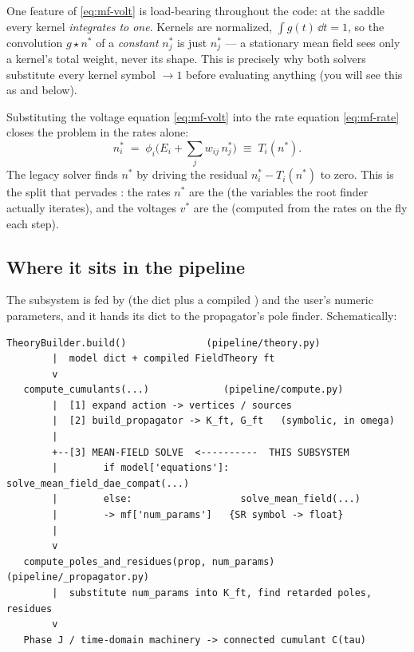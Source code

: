One feature of \eqref{eq:mf-volt} is load-bearing throughout the code: at the
saddle every kernel \emph{integrates to one}. Kernels are normalized,
$\int g(t)\,\dd t = 1$, so the convolution $g\star n^{*}$ of a \emph{constant}
$n^{*}_j$ is just $n^{*}_j$ --- a stationary mean field sees only a kernel's total
weight, never its shape. This is precisely why both solvers substitute every
kernel symbol $\to 1$ before evaluating anything (you will see this as
 and  below).

Substituting the voltage equation \eqref{eq:mf-volt} into the rate equation
\eqref{eq:mf-rate} closes the problem in the rates alone:
\begin{equation}
  n^{*}_i \;=\; \phi_i\!\Big(E_i + \sum_j w_{ij}\, n^{*}_j\Big)
    \;\equiv\; T_i(n^{*}).
  \label{eq:mf-closure}
\end{equation}
The legacy solver finds $n^{*}$ by driving the residual $n^{*}_i - T_i(n^{*})$ to
zero. This is the split that pervades : the rates $n^{*}$
are the  (the variables the root finder actually
iterates), and the voltages $v^{*}$ are the  (computed from
the rates on the fly each step).

\subsection{Where it sits in the pipeline}

The subsystem is fed by  (the  dict plus a
compiled ) and the user's numeric parameters, and it hands its
 dict to the propagator's pole finder. Schematically:

\begin{lstlisting}[style=console]
   TheoryBuilder.build()              (pipeline/theory.py)
        |  model dict + compiled FieldTheory ft
        v
   compute_cumulants(...)             (pipeline/compute.py)
        |  [1] expand action -> vertices / sources
        |  [2] build_propagator -> K_ft, G_ft   (symbolic, in omega)
        |
        +--[3] MEAN-FIELD SOLVE  <----------  THIS SUBSYSTEM
        |        if model['equations']: solve_mean_field_dae_compat(...)
        |        else:                   solve_mean_field(...)
        |        -> mf['num_params']   {SR symbol -> float}
        |
        v
   compute_poles_and_residues(prop, num_params)   (pipeline/_propagator.py)
        |  substitute num_params into K_ft, find retarded poles, residues
        v
   Phase J / time-domain machinery -> connected cumulant C(tau)
\end{lstlisting}

